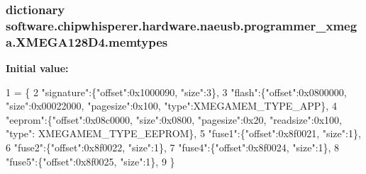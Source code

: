 \subsubsection[{memtypes}]{\setlength{\rightskip}{0pt plus 5cm}dictionary software.\+chipwhisperer.\+hardware.\+naeusb.\+programmer\+\_\+xmega.\+X\+M\+E\+G\+A128\+D4.\+memtypes\hspace{0.3cm}{\ttfamily [static]}}\label{classsoftware_1_1chipwhisperer_1_1hardware_1_1naeusb_1_1programmer__xmega_1_1XMEGA128D4_a4ab483d6d6496c8849ba0bbfa1204b85}
{\bfseries Initial value\+:}
\begin{DoxyCode}
1 = \{
2        \textcolor{stringliteral}{"signature"}:\{\textcolor{stringliteral}{"offset"}:0x1000090, \textcolor{stringliteral}{"size"}:3\},
3        \textcolor{stringliteral}{"flash"}:\{\textcolor{stringliteral}{"offset"}:0x0800000, \textcolor{stringliteral}{"size"}:0x00022000, \textcolor{stringliteral}{"pagesize"}:0x100, \textcolor{stringliteral}{"type"}:XMEGAMEM\_TYPE\_APP\},
4        \textcolor{stringliteral}{"eeprom"}:\{\textcolor{stringliteral}{"offset"}:0x08c0000, \textcolor{stringliteral}{"size"}:0x0800, \textcolor{stringliteral}{"pagesize"}:0x20, \textcolor{stringliteral}{"readsize"}:0x100, \textcolor{stringliteral}{"type"}:
      XMEGAMEM\_TYPE\_EEPROM\},
5        \textcolor{stringliteral}{"fuse1"}:\{\textcolor{stringliteral}{"offset"}:0x8f0021, \textcolor{stringliteral}{"size"}:1\},
6        \textcolor{stringliteral}{"fuse2"}:\{\textcolor{stringliteral}{"offset"}:0x8f0022, \textcolor{stringliteral}{"size"}:1\},
7        \textcolor{stringliteral}{"fuse4"}:\{\textcolor{stringliteral}{"offset"}:0x8f0024, \textcolor{stringliteral}{"size"}:1\},
8        \textcolor{stringliteral}{"fuse5"}:\{\textcolor{stringliteral}{"offset"}:0x8f0025, \textcolor{stringliteral}{"size"}:1\},
9      \}
\end{DoxyCode}
\hypertarget{classsoftware_1_1chipwhisperer_1_1hardware_1_1naeusb_1_1programmer__xmega_1_1XMEGA128D4_ac4071eb86a6637805093cb8fb9712c3c}{}
